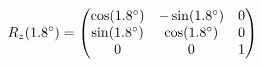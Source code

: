 \documentclass[preview]{standalone}
\begin{document}
\begin{align*}
\special{dvisvgm:raw <g id='unique000'>}R_z(1.8^\circ) = \begin{pmatrix} \cos(1.8^\circ) & -\sin(1.8^\circ) & 0 \\ \sin(1.8^\circ) & \cos(1.8^\circ) & 0 \\ 0 & 0 & 1 \end{pmatrix}\special{dvisvgm:raw </g>}
\end{align*}
\end{document}
